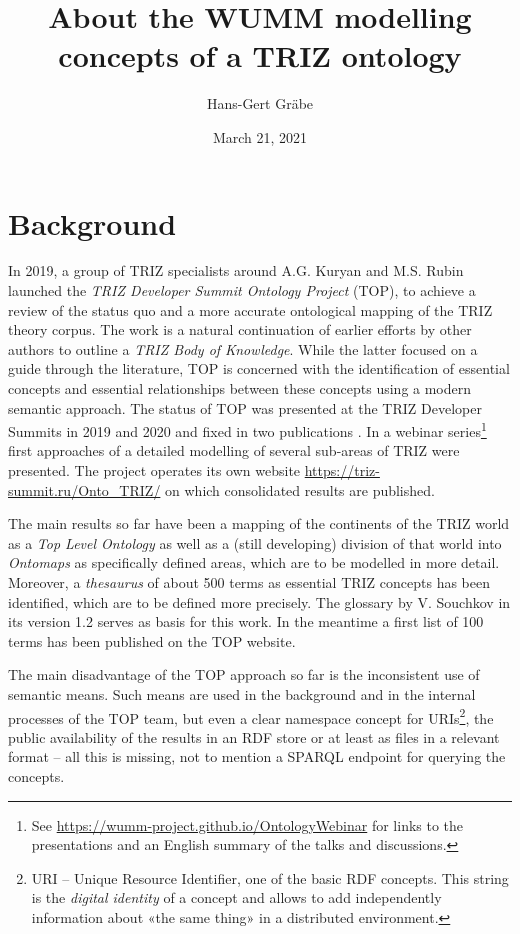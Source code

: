 \documentclass[11pt,a4paper]{article}
\title{About the WUMM modelling concepts of a TRIZ ontology}
\author{Hans-Gert Gr\"abe}
\date{March 21,  2021}
\begin{document}
\maketitle

\section{Background}

In 2019, a group of TRIZ specialists around A.G. Kuryan and M.S. Rubin
launched the \emph{TRIZ Developer Summit Ontology Project} (TOP), to achieve a
review of the status quo and a more accurate ontological mapping of the TRIZ
theory corpus. The work is a natural continuation of earlier efforts by other
authors \cite{TBK2007, TBK2012} to outline a \emph{TRIZ Body of Knowledge}.
While the latter focused on a guide through the literature, TOP is concerned
with the identification of essential concepts and essential relationships
between these concepts using a modern semantic approach. The status of TOP was
presented at the TRIZ Developer Summits in 2019 and 2020 and fixed in two
publications \cite{TOP2019, TOP2020}. In a webinar series\footnote{See
  \url{https://wumm-project.github.io/OntologyWebinar} for links to the
  presentations and an English summary of the talks and discussions.}  first
approaches of a detailed modelling of several sub-areas of TRIZ were
presented.  The project operates its own website
\url{https://triz-summit.ru/Onto_TRIZ/} on which consolidated results are
published.

The main results so far have been a mapping of the continents of the TRIZ
world as a \emph{Top Level Ontology} as well as a (still developing) division
of that world into \emph{Ontomaps} as specifically defined areas, which are to
be modelled in more detail. Moreover, a \emph{thesaurus} of about 500 terms as
essential TRIZ concepts has been identified, which are to be defined more
precisely. The glossary \cite{Souchkov2018} by V. Souchkov in its version 1.2
serves as basis for this work. In the meantime a first list of 100 terms
\cite{TOP-Glossary} has been published on the TOP website.

The main disadvantage of the TOP approach so far is the inconsistent use of
semantic means. Such means are used in the background and in the internal
processes of the TOP team, but even a clear namespace concept for
URIs\footnote{URI -- Unique Resource Identifier, one of the basic RDF
  concepts. This string is the \emph{digital identity} of a concept and allows
  to add independently information about «the same thing» in a distributed
  environment. }, the public availability of the results in an RDF store or at
least as files in a relevant format -- all this is missing, not to mention a
SPARQL endpoint for querying the concepts.
\end{document}
